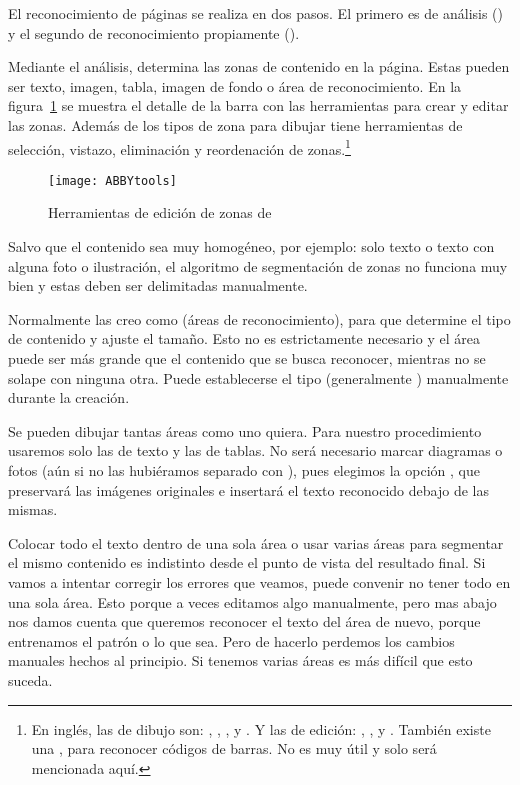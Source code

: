 \documentclass[%
	a5paper,
	10pt,
	twoside,
	openright,
	final,
]{memoir}
\begin{document}
	El reconocimiento de páginas se realiza en dos pasos. El primero es de análisis () y el segundo de reconocimiento propiamente ().

	Mediante el análisis, \abby determina las zonas de contenido en la página. Estas pueden ser texto, imagen, tabla, imagen de fondo o área de reconocimiento. En la figura~\ref{fig:ABBYtools} se muestra el detalle de la barra con las herramientas para crear y editar las zonas. Además de los tipos de zona para dibujar tiene herramientas de selección, vistazo, eliminación y reordenación de zonas.\footnote{En inglés, las de dibujo son: , , ,  y . Y las de edición: , ,  y . También existe una , para reconocer códigos de barras. No es muy útil y solo será mencionada aquí.}

	\begin{figure}
		\centering
		\texttt{[image: ABBYtools]}
		\caption{Herramientas de edición de zonas de \abby\label{fig:ABBYtools}}
	\end{figure}

	Salvo que el contenido sea muy homogéneo, por ejemplo: solo texto o texto con alguna foto o ilustración, el algoritmo de segmentación de zonas no funciona muy bien y estas deben ser delimitadas manualmente.

	Normalmente las creo como  (áreas de reconocimiento), para que \abby determine el tipo de contenido y ajuste el tamaño. Esto no es estrictamente necesario y el área puede ser más grande que el contenido que se busca reconocer, mientras no se solape con ninguna otra. Puede establecerse el tipo (generalmente ) manualmente durante la creación.

	Se pueden dibujar tantas áreas como uno quiera. Para nuestro procedimiento usaremos solo las de texto y las de tablas. No será necesario marcar diagramas o fotos (aún si no las hubiéramos separado con \scantailor), pues elegimos la opción , que preservará las imágenes originales e insertará el texto reconocido debajo de las mismas.

	Colocar todo el texto dentro de una sola área o usar varias áreas para segmentar el mismo contenido es indistinto desde el punto de vista del resultado final. Si vamos a intentar corregir los errores que veamos, puede convenir no tener todo en una sola área. Esto porque a veces editamos algo manualmente, pero mas abajo nos damos cuenta que queremos reconocer el texto del área de nuevo, porque entrenamos el patrón o lo que sea. Pero de hacerlo perdemos los cambios manuales hechos al principio. Si tenemos varias áreas es más difícil que esto suceda.
\end{document}
